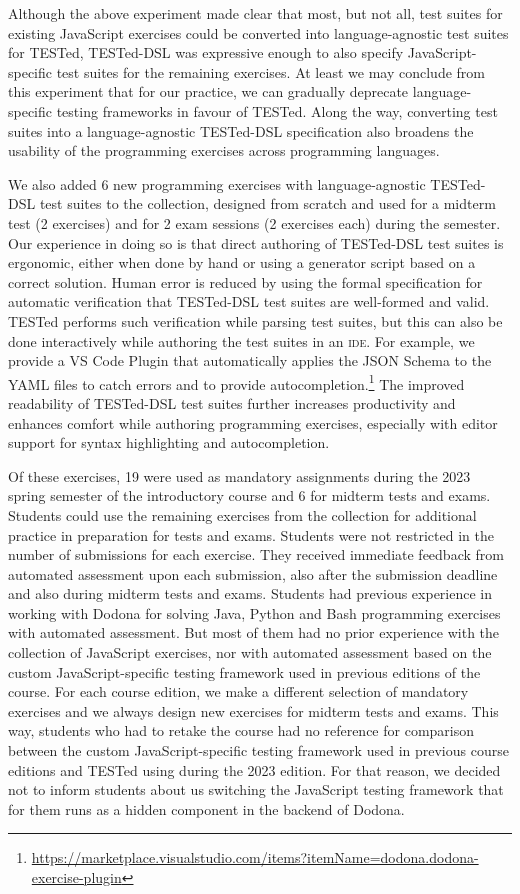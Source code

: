 \documentclass[../main]{subfiles}
\begin{document}
Although the above experiment made clear that most, but not all, test suites for existing JavaScript exercises could be converted into language-agnostic test suites for TESTed, TESTed-DSL was expressive enough to also specify JavaScript-specific test suites for the remaining exercises.
At least we may conclude from this experiment that for our practice, we can gradually deprecate language-specific testing frameworks in favour of TESTed.
Along the way, converting test suites into a language-agnostic TESTed-DSL specification also broadens the usability of the programming exercises across programming languages.

We also added 6 new programming exercises with language-agnostic TESTed-DSL test suites to the collection, designed from scratch and used for a midterm test (2 exercises) and for 2 exam sessions (2 exercises each) during the semester.
Our experience in doing so is that direct authoring of TESTed-DSL test suites is ergonomic, either when done by hand or using a generator script based on a correct solution.
Human error is reduced by using the formal specification for automatic verification that TESTed-DSL test suites are well-formed and valid.
TESTed performs such verification while parsing test suites, but this can also be done interactively while authoring the test suites in an \textsc{ide}.
For example, we provide a VS Code Plugin that automatically applies the JSON Schema to the YAML files to catch errors and to provide autocompletion.\footnote{\url{https://marketplace.visualstudio.com/items?itemName=dodona.dodona-exercise-plugin}}
The improved readability of TESTed-DSL test suites further increases productivity and enhances comfort while authoring programming exercises, especially with editor support for syntax highlighting and autocompletion.

Of these exercises, \num{19} were used as mandatory assignments during the 2023 spring semester of the introductory course and \num{6} for midterm tests and exams.
Students could use the remaining exercises from the collection for additional practice in preparation for tests and exams.
Students were not restricted in the number of submissions for each exercise.
They received immediate feedback from automated assessment upon each submission, also after the submission deadline and also during midterm tests and exams.
Students had previous experience in working with Dodona for solving Java, Python and Bash programming exercises with automated assessment.
But most of them had no prior experience with the collection of JavaScript exercises, nor with automated assessment based on the custom JavaScript-specific testing framework used in previous editions of the course.
For each course edition, we make a different selection of mandatory exercises and we always design new exercises for midterm tests and exams.
This way, students who had to retake the course had no reference for comparison between the custom JavaScript-specific testing framework used in previous course editions and TESTed using during the 2023 edition.
For that reason, we decided not to inform students about us switching the JavaScript testing framework that for them runs as a hidden component in the backend of Dodona.
\end{document}
